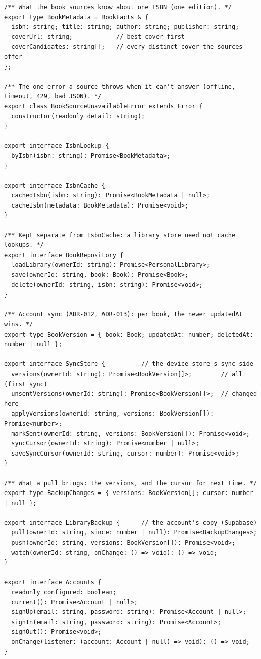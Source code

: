 \documentclass[12pt]{article}
\begin{document}
\begin{lstlisting}
/** What the book sources know about one ISBN (one edition). */
export type BookMetadata = BookFacts & {
  isbn: string; title: string; author: string; publisher: string;
  coverUrl: string;            // best cover first
  coverCandidates: string[];   // every distinct cover the sources offer
};

/** The one error a source throws when it can't answer (offline, timeout, 429, bad JSON). */
export class BookSourceUnavailableError extends Error {
  constructor(readonly detail: string);
}

export interface IsbnLookup {
  byIsbn(isbn: string): Promise<BookMetadata>;
}

export interface IsbnCache {
  cachedIsbn(isbn: string): Promise<BookMetadata | null>;
  cacheIsbn(metadata: BookMetadata): Promise<void>;
}

/** Kept separate from IsbnCache: a library store need not cache lookups. */
export interface BookRepository {
  loadLibrary(ownerId: string): Promise<PersonalLibrary>;
  save(ownerId: string, book: Book): Promise<Book>;
  delete(ownerId: string, isbn: string): Promise<void>;
}

/** Account sync (ADR-012, ADR-013): per book, the newer updatedAt wins. */
export type BookVersion = { book: Book; updatedAt: number; deletedAt: number | null };

export interface SyncStore {          // the device store's sync side
  versions(ownerId: string): Promise<BookVersion[]>;        // all (first sync)
  unsentVersions(ownerId: string): Promise<BookVersion[]>;  // changed here
  applyVersions(ownerId: string, versions: BookVersion[]): Promise<number>;
  markSent(ownerId: string, versions: BookVersion[]): Promise<void>;
  syncCursor(ownerId: string): Promise<number | null>;
  saveSyncCursor(ownerId: string, cursor: number): Promise<void>;
}

/** What a pull brings: the versions, and the cursor for next time. */
export type BackupChanges = { versions: BookVersion[]; cursor: number | null };

export interface LibraryBackup {      // the account's copy (Supabase)
  pull(ownerId: string, since: number | null): Promise<BackupChanges>;
  push(ownerId: string, versions: BookVersion[]): Promise<void>;
  watch(ownerId: string, onChange: () => void): () => void;
}

export interface Accounts {
  readonly configured: boolean;
  current(): Promise<Account | null>;
  signUp(email: string, password: string): Promise<Account | null>;
  signIn(email: string, password: string): Promise<Account>;
  signOut(): Promise<void>;
  onChange(listener: (account: Account | null) => void): () => void;
}
\end{lstlisting}
\end{document}
